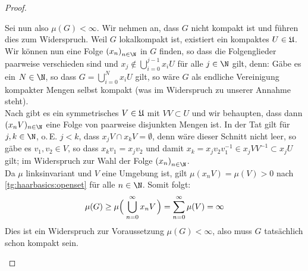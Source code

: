 \begin{proof}
\begin{enumerate}[(a)]
            Sei nun also $\mu(G)<\infty$. Wir nehmen an, dass $G$ nicht kompakt
            ist und führen dies zum Widerspruch. Weil $G$ lokalkompakt ist,
            existiert ein kompaktes $U\in\mathfrak{U}$. Wir können nun eine Folge
            $\Nfolge x$ in $G$ finden, so dass die Folgenglieder paarweise
            verschieden sind und
            $x_j\notin \bigcup_{i=0}^{j-1} x_iU$ für alle $j\in\N$ gilt, denn:
            Gäbe es ein $N\in\N$, so dass $G=\bigcup_{i=0}^N x_iU$ gilt, so wäre
            $G$ als endliche Vereinigung kompakter Mengen selbst kompakt (was im
            Widerspruch zu unserer Annahme steht).
            \\
            Nach 
            gibt es ein symmetrisches $V\in\mathfrak{U}$ mit $VV\subset U$ und wir
            behaupten, dass dann $(x_nV)_{n\in\N}$ eine Folge von paarweise
            disjunkten Mengen ist. In der Tat gilt für $j,k\in\N$, o.\,E. $j<k$,
            dass $x_jV \cap x_kV = \emptyset$, denn wäre dieser Schnitt nicht
            leer, so gäbe es $v_1,v_2\in V$, so dass $x_kv_1 = x_jv_2$ und damit
            $x_k=x_jv_2v_1^{-1} \in x_jVV^{-1} \subset x_jU$ gilt; im
            Widerspruch zur Wahl der Folge $\Nfolge x$.
            \\
            Da $\mu$ linksinvariant und $V$ eine Umgebung ist, 
            gilt $\mu(x_nV) = \mu(V) > 0$ nach \ref{tg:haarbasics:openset} für
            alle $n\in\N$.
            Somit folgt: 
            \[ \mu(G) \geq \mu\Bigl(\; \bigcup_{n=0}^\infty x_nV \mkern2mu\Bigr) 
                = \sum_{n=0}^\infty \mu(V) = \infty
            \]
            Dies ist ein Widerspruch zur Voraussetzung $\mu(G)<\infty$, also muss $G$
            tatsächlich schon kompakt sein.
    \end{enumerate}
\end{proof}


